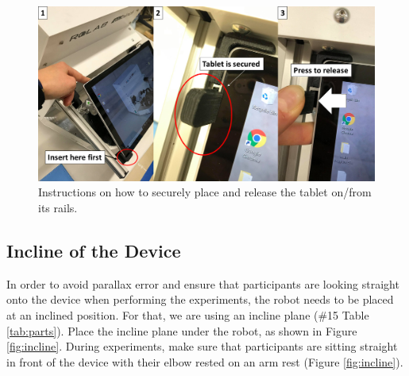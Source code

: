 \documentclass[10pt,oneside,a4paper]{article}
\begin{document}
\begin{figure}[h!]
\begin{center}
\includegraphics[width=\columnwidth]{images/Hardware/tabletPlacement.png}
\caption{Instructions on how to securely place and release the tablet on/from its rails.}
\label{fig:tabletPlacement}
\end{center}
\end{figure}

\subsection{Incline of the Device}
In order to avoid parallax error and ensure that participants are looking straight onto the device when performing the experiments, the robot needs to be placed at an inclined position. For that, we are using an incline plane (\#15 Table \ref{tab:parts}). Place the incline plane under the robot, as shown in Figure \ref{fig:incline}. During experiments, make sure that participants are sitting straight in front of the device with their elbow rested on an arm rest (Figure \ref{fig:incline}).
\end{document}
